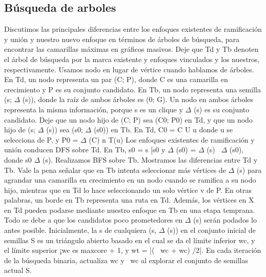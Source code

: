 \subsection{Búsqueda de arboles}
Discutimos las principales diferencias entre los enfoques existentes de ramificación y unión y nuestro nuevo enfoque en términos de árboles de búsqueda, para encontrar las camarillas máximas en gráficos masivos. Deje que Td y Tb denoten el árbol de búsqueda por la marca existente y enfoques vinculados y los nuestros, respectivamente. Usamos nodo en lugar de vértice cuando hablamos de árboles. En Td, un nodo representa un par (C; P), donde C es una camarilla en crecimiento y P es su conjunto candidato. En Tb, un nodo representa una semilla (s; \begin{math}\Delta\end{math} (s)), donde la raíz de ambos árboles es (0; G). Un nodo en ambos árboles representa la misma información, porque s es un clique y \begin{math}\Delta\end{math} (s) es su conjunto candidato. Deje que un nodo hijo de (C; P) sea (C0; P0) en Td, y que un nodo hijo de (s; \begin{math}\Delta\end{math} (s)) sea (s0; \begin{math}\Delta\end{math} (s0)) en Tb. En Td, C0 = C U {u} donde u se selecciona de P, y P0 = \begin{math}\Delta\end{math} (C) n T(u) Los enfoques existentes de ramificación y unión conducen DFS sobre Td. En Tb, s0 = s [s0 y \begin{math}\Delta\end{math} (s0) = \begin{math}\Delta\end{math} (s) \ \begin{math}\Delta\end{math} (s0), donde s0 \begin{math}\Delta\end{math} (s). Realizamos BFS sobre Tb. Mostramos las diferencias entre Td y Tb. Vale la pena señalar que en Tb intenta seleccionar más vértices de \begin{math}\Delta\end{math} (s) para agrandar una camarilla en crecimiento en un nodo cuando se ramifica a su nodo hijo, mientras que en Td lo hace seleccionando un solo vértice v de P. En otras palabras, un borde en Tb representa una ruta en Td. Además, los vértices en X en Td pueden podarse mediante nuestro enfoque en Tb en una etapa temprana. Todo se debe a que los candidatos poco prometedores en \begin{math}\Delta\end{math} (s) serán podados lo antes posible. Inicialmente, la s de cualquiera (s, \begin{math}\Delta\end{math} (s)) en el conjunto inicial de semillas S es un triángulo abierto basado en el cual se da el límite inferior wc, y el límite superior ¡wc es maxcore + 1, y wt = |( ~wc + wc) /2|. En cada iteración de la búsqueda binaria, actualiza wc y ~wc al explorar el conjunto de semillas actual S. 
